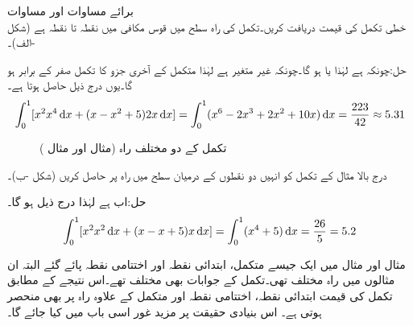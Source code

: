 \quad برائے مساوات  اور مساوات \\
خطی تکمل   کی قیمت دریافت کریں۔تکمل کی راہ سطح  میں قوس مکافی   میں نقطہ  تا نقطہ  ہے (شکل -الف)۔

حل:چونکہ  ہے لہٰذا  یا  ہو گا۔چونکہ  غیر متغیر ہے لہٰذا متکمل کے آخری جزو کا تکمل صفر کے برابر ہو گا۔یوں درج ذیل حاصل ہوتا ہے۔
\begin{align*}
\int_0^1[x^2 x^4\dif x+(x-x^2+5)2x\dif x]=\int_0^1 (x^6-2x^3+2x^2+10x)\dif x=\frac{223}{42}\approx 5.31
\end{align*}
%
\begin{figure}
\centering
{}
\caption{تکمل کے دو مختلف راہ (مثال  اور مثال )}
\label{شکل_خطی_تکمل_تکمل_مختلف_راہ}
\end{figure}
درج بالا مثال کے تکمل کو انہیں دو نقطوں کے درمیان  سطح  میں راہ  پر  حاصل کریں (شکل -ب)۔

حل:اب  ہے لہٰذا درج ذیل ہو گا۔
\begin{align*}
\int_0^1[x^2 x^2\dif x+(x-x+5)x\dif x]=\int_0^1 (x^4+5)\dif x=\frac{26}{5}=5.2
\end{align*}

مثال  اور مثال  میں ایک جیسے متکمل، ابتدائی نقطہ اور اختتامی نقطہ پائے گئے البتہ ان مثالوں میں راہ مختلف تھی۔تکمل کے جوابات بھی مختلف تھے۔اس نتیجے کے مطابق تکمل کی قیمت ابتدائی نقطہ، اختتامی نقطہ اور متکمل کے علاوہ راہ پر بھی منحصر ہوتی ہے۔ اس بنیادی حقیقت پر مزید غور اسی باب میں کیا جائے گا۔

